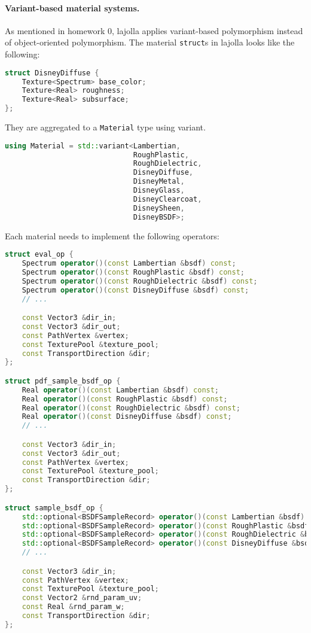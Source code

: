 \paragraph{Variant-based material systems.} As mentioned in homework 0, lajolla applies variant-based polymorphism instead of object-oriented polymorphism. The material \lstinline{struct}s in lajolla looks like the following:
\begin{lstlisting}[language=c++]
struct DisneyDiffuse {
    Texture<Spectrum> base_color;
    Texture<Real> roughness;
    Texture<Real> subsurface;
};
\end{lstlisting}
They are aggregated to a \lstinline{Material} type using variant.
\begin{lstlisting}[language=c++]
using Material = std::variant<Lambertian,
                              RoughPlastic,
                              RoughDielectric,
                              DisneyDiffuse,
                              DisneyMetal,
                              DisneyGlass,
                              DisneyClearcoat,
                              DisneySheen,
                              DisneyBSDF>;
\end{lstlisting}
Each material needs to implement the following operators:
\begin{lstlisting}[language=c++]
struct eval_op {
    Spectrum operator()(const Lambertian &bsdf) const;
    Spectrum operator()(const RoughPlastic &bsdf) const;
    Spectrum operator()(const RoughDielectric &bsdf) const;
    Spectrum operator()(const DisneyDiffuse &bsdf) const;
    // ...

    const Vector3 &dir_in;
    const Vector3 &dir_out;
    const PathVertex &vertex;
    const TexturePool &texture_pool;
    const TransportDirection &dir;
};

struct pdf_sample_bsdf_op {
    Real operator()(const Lambertian &bsdf) const;
    Real operator()(const RoughPlastic &bsdf) const;
    Real operator()(const RoughDielectric &bsdf) const;
    Real operator()(const DisneyDiffuse &bsdf) const;
    // ...

    const Vector3 &dir_in;
    const Vector3 &dir_out;
    const PathVertex &vertex;
    const TexturePool &texture_pool;
    const TransportDirection &dir;
};

struct sample_bsdf_op {
    std::optional<BSDFSampleRecord> operator()(const Lambertian &bsdf) const;
    std::optional<BSDFSampleRecord> operator()(const RoughPlastic &bsdf) const;
    std::optional<BSDFSampleRecord> operator()(const RoughDielectric &bsdf) const;
    std::optional<BSDFSampleRecord> operator()(const DisneyDiffuse &bsdf) const;
    // ...

    const Vector3 &dir_in;
    const PathVertex &vertex;
    const TexturePool &texture_pool;
    const Vector2 &rnd_param_uv;
    const Real &rnd_param_w;
    const TransportDirection &dir;
};
\end{lstlisting}


